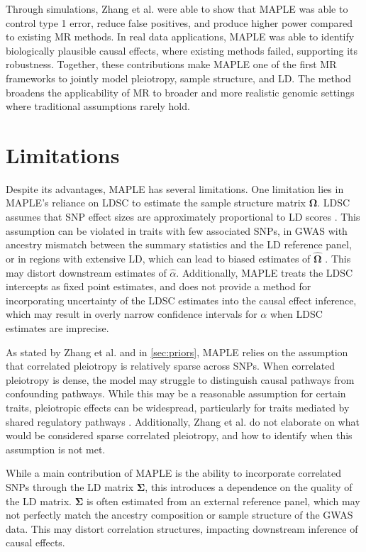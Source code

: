 \documentclass[12pt]{article}
\begin{document}
Through simulations, Zhang et al. were able to show that MAPLE was able to control type 1 error, reduce false positives, and produce higher power compared to existing MR methods. In real data applications, MAPLE was able to identify biologically plausible causal effects, where existing methods failed, supporting its robustness. Together, these contributions make MAPLE one of the first MR frameworks to jointly model pleiotropy, sample structure, and LD. The method broadens the applicability of MR to broader and more realistic genomic settings where traditional assumptions rarely hold.

\section{Limitations}\label{sec:limitation}
Despite its advantages, MAPLE has several limitations. One limitation lies in MAPLE’s reliance on LDSC to estimate the sample structure matrix $\boldsymbol{\Omega}$. LDSC assumes that SNP effect sizes are approximately proportional to LD scores \citep{BS2015, PattilloSmith2024}. This assumption can be violated in traits with few associated SNPs, in GWAS with ancestry mismatch between the summary statistics and the LD reference panel, or in regions with extensive LD, which can lead to biased estimates of $\boldsymbol{\hat\Omega}$ \citep{PattilloSmith2024}. This may distort downstream estimates of $\hat{\alpha}$. Additionally, MAPLE treats the LDSC intercepts as fixed point estimates, and does not provide a method for incorporating uncertainty of the LDSC estimates into the causal effect inference, which may result in overly narrow confidence intervals for $\alpha$ when LDSC estimates are imprecise.

As stated by Zhang et al. and in \cref{sec:priors}, MAPLE relies on the assumption that correlated pleiotropy is relatively sparse across SNPs. When correlated pleiotropy is dense, the model may struggle to distinguish causal pathways from confounding pathways. While this may be a reasonable assumption for certain traits, pleiotropic effects can be widespread, particularly for traits mediated by shared regulatory pathways \citep{Solovieff2013}. Additionally, Zhang et al. do not elaborate on what would be considered sparse correlated pleiotropy, and how to identify when this assumption is not met.

While a main contribution of MAPLE is the ability to incorporate correlated SNPs through the LD matrix $\boldsymbol{\Sigma}$, this introduces a dependence on the quality of the LD matrix. $\boldsymbol \Sigma$ is often estimated from an external reference panel, which may not perfectly match the ancestry composition or sample structure of the GWAS data. This may distort correlation structures, impacting downstream inference of causal effects. 
 
\end{document}
